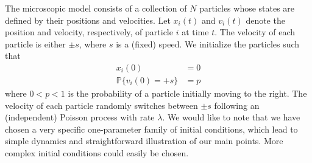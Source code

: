 \documentclass[preprint]{elsarticle}
\begin{document}

The microscopic model consists of a collection of $N$ particles whose states are defined by their positions and velocities. 
%
Let $x_i(t)$ and $v_i(t)$ denote the position and velocity, respectively, of particle $i$ at time $t$.
%
The velocity of each particle is either $\pm s$, where $s$ is a (fixed) speed. 
%
We initialize the particles such that
\begin{equation}\label{eqn:system}
\begin{aligned}
x_i(0) & = 0 \\
\mathbb{P} \{ v_i(0) = +s \} & = p
\end{aligned}
\end{equation}
where $0 < p < 1$ is the probability of a particle initially moving to the right.
%
The velocity of each particle randomly switches between $\pm s$ following an (independent) Poisson process with rate $\lambda$.
%
We would like to note that we have chosen a very specific one-parameter family of initial conditions, which lead to simple dynamics and straightforward illustration of our main points.
%
More complex initial conditions could easily be chosen. 
\end{document}
